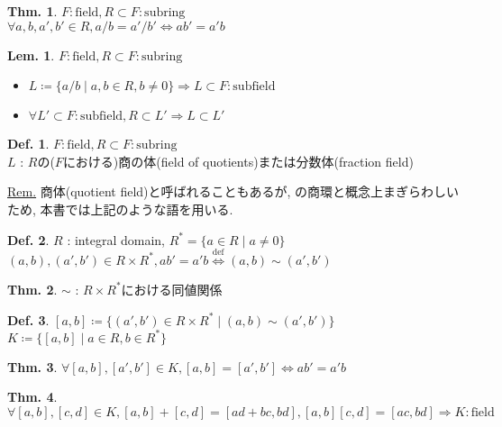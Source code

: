 \documentclass[uplatex,dvipdfmx,9pt]{beamer}
\newcommand{\defarrow}{\overset{\mathrm{def}}{\Leftrightarrow}}
\newcounter{textLemCount}
\theoremstyle{definition} %
\newtheorem{defn}{Def.}[subsection] %
\newtheorem{thm}{Thm.}[subsection] %
\newtheorem{lemText}[textLemCount]{Lem.} %
\theoremstyle{example}
\begin{document}
\begin{frame}

  \begin{thm}
    $F : \text{field}, R \subset F : \text{subring}$ \\
    $\forall a, b, a', b' \in R, a/b = a'/b' \Leftrightarrow ab' = a'b$
  \end{thm}

  \begin{lemText}
    $F : \text{field}, R \subset F : \text{subring}$ \\
    \begin{itemize}
      \item $L \coloneqq \{a/b \mid a,b \in R, b \neq 0\} \Rightarrow L \subset F : \text{subfield}$
      \item $\forall L' \subset F : \text{subfield}, R \subset L' \Rightarrow L \subset L'$
    \end{itemize}
  \end{lemText}

  \begin{defn}
    $F : \text{field}, R \subset F : \text{subring}$ \\
    $L$ : $R$の($F$における)\alert{商の体(field of quotients)}または\alert{分数体(fraction field)}
  \end{defn}
  \underline{Rem.} 商体(quotient field)と呼ばれることもあるが,  の商環と概念上まぎらわしいため, 本書では上記のような語を用いる.

\end{frame}

\begin{frame}

  \begin{defn}
    $R$ : integral domain, $R^* = \{ a \in R \mid a \neq 0\}$ \\
    $(a, b), (a', b') \in R \times R^*, ab' = a'b \defarrow (a, b) \sim (a', b')$
  \end{defn}

  \begin{thm}
    $\sim$ : $R \times R^*$における同値関係
  \end{thm}

  \begin{defn}
    $[a, b] \coloneqq \{(a', b') \in R \times R^* \mid (a, b) \sim (a', b')\}$ \\
    $K \coloneqq \{[a, b] \mid a \in R, b \in R^*\}$
  \end{defn}

  \begin{thm}
    $\forall [a, b], [a', b'] \in K, [a, b] = [a', b'] \Leftrightarrow ab' = a'b$
  \end{thm}

  \begin{thm}
    $\forall [a, b], [c, d] \in K, [a, b] + [c, d] = [ad + bc, bd], [a, b][c, d] = [ac, bd] \Rightarrow K : \text{field}$
  \end{thm}

\end{frame}
\end{document}
